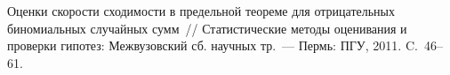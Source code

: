\begin{multicols}{2}
{{\begin{thebibliography}{99}
\label{end\stat}

 Оценки скорости сходимости в предельной
теореме для отрицательных биномиальных случайных сумм~//
Статистические методы оценивания и проверки гипотез: Межвузовский
сб. научных тр.~--- Пермь: ПГУ, 2011. C.~46--61.
\end{thebibliography}
}
}


\end{multicols}